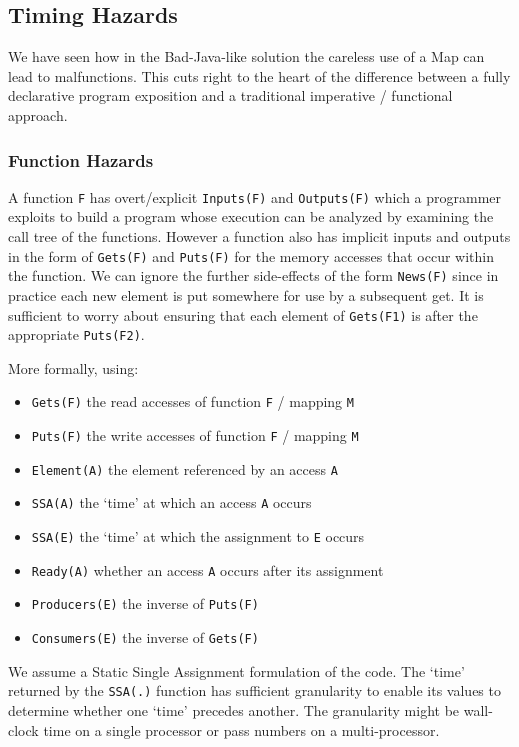 \documentclass{jot}
\begin{document}
\subsection{Timing Hazards}

We have seen how in the Bad-Java-like solution the careless use of a Map can lead to malfunctions. This cuts right to the heart of the difference between a fully declarative program exposition and a traditional imperative / functional approach.

\subsubsection{Function Hazards}

A function \verb|F| has overt/explicit \verb|Inputs(F)| and \verb|Outputs(F)| which a programmer exploits to build a program whose execution can be analyzed by examining the call tree of the functions. However a function also has implicit inputs and outputs in the form of \verb|Gets(F)| and \verb|Puts(F)| for the memory accesses that occur within the function. We can ignore the further side-effects of the form \verb|News(F)| since in practice each new element is put somewhere for use by a subsequent get. It is sufficient to worry about ensuring that each element of \verb|Gets(F1)| is after the appropriate \verb|Puts(F2)|.

More formally, using:

\begin{itemize}
	\item \verb|Gets(F)| the read accesses of function \verb|F| / mapping \verb|M|
	\item \verb|Puts(F)| the write accesses of function \verb|F| / mapping \verb|M|
	\item \verb|Element(A)| the element referenced by an access \verb|A|
	\item \verb|SSA(A)| the `time' at which an access \verb|A| occurs
	\item \verb|SSA(E)| the `time' at which the assignment to \verb|E| occurs
	\item \verb|Ready(A)| whether an access \verb|A| occurs after its assignment
	\item \verb|Producers(E)| the inverse of \verb|Puts(F)|
	\item \verb|Consumers(E)| the inverse of \verb|Gets(F)|
\end{itemize}

We assume a Static Single Assignment formulation of the code. The `time' returned by the \verb|SSA(.)| function has sufficient granularity to enable its values to determine whether one `time' precedes another. The granularity might be wall-clock time on a single processor or pass numbers on a multi-processor.
\end{document}
